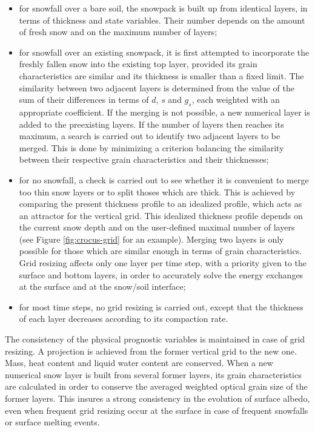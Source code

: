 \begin{itemize}

 \item for snowfall over a bare soil, the snowpack is built up from
   identical layers, in terms of thickness and state variables. Their
   number depends on the amount of fresh snow and on the maximum
   number of layers;

\item  for snowfall over an existing snowpack, it is first attempted
  to incorporate the freshly fallen snow into the existing top layer,
  provided its grain characteristics are similar and its thickness is
  smaller than a fixed limit. The similarity between two adjacent
  layers is determined from the value of the sum of their differences
  in terms of $d$, $s$ and $g_s$, each weighted with an appropriate
  coefficient. If the merging is not possible, a new numerical layer
  is added to the preexisting layers. If the number of layers then
  reaches its maximum, a search is carried out to identify two
  adjacent layers to be merged. This is done by minimizing a criterion
  balancing the similarity between their respective grain
  characteristics and their thicknesses;

\item for no snowfall, a check is carried out to see whether it is
  convenient to merge too thin snow layers or to split thoses which
  are thick. This is achieved by comparing the present thickness
  profile to an idealized profile, which acts as an attractor for the
  vertical grid. This idealized thickness profile depends on the
  current snow depth and on the user-defined maximal number of layers
  (see Figure \ref{fig:crocus-grid} for an example). Merging two
  layers is only possible for those which are similar enough in terms
  of grain characteristics. Grid resizing affects only one layer per
  time step, with a priority given to the surface and bottom layers,
  in order to accurately solve the energy exchanges at the surface and
  at the snow/soil interface;

\item for most time steps, no grid resizing is carried out, except
  that the thickness of each layer decreases according to its
  compaction rate.

\end{itemize}

The consistency of the physical prognostic variables is maintained in
case of grid resizing. A projection is achieved from the former
vertical grid to the new one. Mass, heat content and liquid water
content are conserved.  When a new numerical snow layer is built from
several former layers, its grain characteristics are calculated in
order to conserve the averaged weighted optical grain size of the
former layers. This insures a strong consistency in the evolution of
surface albedo, even when frequent grid resizing occur at the surface
in case of frequent snowfalls or surface melting events.


